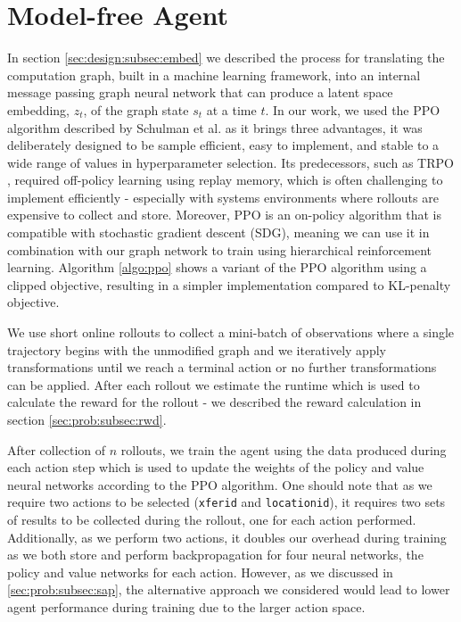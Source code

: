 \section{Model-free Agent}

In section \ref{sec:design:subsec:embed} we described the process for translating the computation graph, built in a machine learning framework, into an internal message passing graph neural network that can produce a latent space embedding, $z_t$, of the graph state $s_t$ at a time $t$. In our work, we used the PPO algorithm  described by Schulman et al. \cite{schulman2017proximal} as it brings three advantages, it was deliberately designed to be sample efficient, easy to implement, and stable to a wide range of values in hyperparameter selection. Its predecessors, such as TRPO \cite{schulman2017trust}, required off-policy learning using replay memory, which is often challenging to implement efficiently - especially with systems environments where rollouts are expensive to collect and store. Moreover, PPO is an on-policy algorithm that is compatible with stochastic gradient descent (SDG), meaning we can use it in combination with our graph network to train using hierarchical reinforcement learning. Algorithm \ref{algo:ppo} shows a variant of the PPO algorithm using a clipped objective, resulting in a simpler implementation compared to KL-penalty objective.




We use short online rollouts to collect a mini-batch of observations where a single trajectory begins with the unmodified graph and we iteratively apply transformations until we reach a terminal action or no further transformations can be applied. After each rollout we estimate the runtime which is used to calculate the reward for the rollout - we described the reward calculation in section \ref{sec:prob:subsec:rwd}.

After collection of $n$ rollouts, we train the agent using the data produced during each action step which is used to update the weights of the policy and value neural networks according to the PPO algorithm. One should note that as we require two actions to be selected (\texttt{xfer\textunderscore id} and \texttt{location\textunderscore id}), it requires two sets of results to be collected during the rollout, one for each action performed. Additionally, as we perform two actions, it doubles our overhead during training as we both store and perform backpropagation for four neural networks, the policy and value networks for each action. However, as we discussed in \ref{sec:prob:subsec:sap}, the alternative approach we considered would lead to lower agent performance during training due to the larger action space.